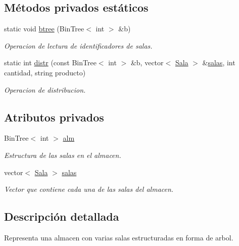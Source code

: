 \subsection*{Métodos privados estáticos}
\begin{DoxyCompactItemize}
\item 
static void \hyperlink{class_almacen_ab17f45bbf11a4c178ee4acefd6d085eb}{btree} (Bin\+Tree$<$ int $>$ \&b)
\begin{DoxyCompactList}\small\item\em Operacion de lectura de identificadores de salas. \end{DoxyCompactList}\item 
static int \hyperlink{class_almacen_a0a613fcb43d66dea5965a3588c66110d}{distr} (const Bin\+Tree$<$ int $>$ \&b, vector$<$ \hyperlink{class_sala}{Sala} $>$ \&\hyperlink{class_almacen_a5c60aa6a014eb6a96a2f5c6fb9a83e52}{salas}, int cantidad, string producto)
\begin{DoxyCompactList}\small\item\em Operacion de distribucion. \end{DoxyCompactList}\end{DoxyCompactItemize}
\subsection*{Atributos privados}
\begin{DoxyCompactItemize}
\item 
Bin\+Tree$<$ int $>$ \hyperlink{class_almacen_a32ee5ed02255216a7ec6ac90e5d2030b}{alm}
\begin{DoxyCompactList}\small\item\em Estructura de las salas en el almacen. \end{DoxyCompactList}\item 
vector$<$ \hyperlink{class_sala}{Sala} $>$ \hyperlink{class_almacen_a5c60aa6a014eb6a96a2f5c6fb9a83e52}{salas}
\begin{DoxyCompactList}\small\item\em Vector que contiene cada una de las salas del almacen. \end{DoxyCompactList}\end{DoxyCompactItemize}


\subsection{Descripción detallada}
Representa una almacen con varias salas estructuradas en forma de arbol. 

